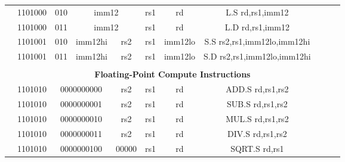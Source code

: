 \begin{table}[p]
\begin{small}
\begin{center}
\begin{tabular}{rcccccccccccl}
&
\multicolumn{1}{|c|}{1101000} &
\multicolumn{1}{c|}{010} &
\multicolumn{4}{c|}{imm12} &
\multicolumn{1}{c|}{rs1} &
\multicolumn{1}{c|}{rd} & L.S rd,rs1,imm12 \\
\cline{2-9}
  

&
\multicolumn{1}{|c|}{1101000} &
\multicolumn{1}{c|}{011} &
\multicolumn{4}{c|}{imm12} &
\multicolumn{1}{c|}{rs1} &
\multicolumn{1}{c|}{rd} & L.D rd,rs1,imm12 \\
\cline{2-9}
  

&
\multicolumn{1}{|c|}{1101001} &
\multicolumn{1}{c|}{010} &
\multicolumn{3}{c|}{imm12hi} &
\multicolumn{1}{c|}{rs2} &
\multicolumn{1}{c|}{rs1} &
\multicolumn{1}{c|}{imm12lo} & S.S rs2,rs1,imm12lo,imm12hi \\
\cline{2-9}
  

&
\multicolumn{1}{|c|}{1101001} &
\multicolumn{1}{c|}{011} &
\multicolumn{3}{c|}{imm12hi} &
\multicolumn{1}{c|}{rs2} &
\multicolumn{1}{c|}{rs1} &
\multicolumn{1}{c|}{imm12lo} & S.D rs2,rs1,imm12lo,imm12hi \\
\cline{2-9}
  

&
\multicolumn{11}{c}{} & \\
&
\multicolumn{11}{c}{\bf Floating-Point Compute Instructions} & \\
\cline{2-9}
  

&
\multicolumn{1}{|c|}{1101010} &
\multicolumn{4}{c|}{0000000000} &
\multicolumn{1}{c|}{rs2} &
\multicolumn{1}{c|}{rs1} &
\multicolumn{1}{c|}{rd} & ADD.S rd,rs1,rs2 \\
\cline{2-9}
  

&
\multicolumn{1}{|c|}{1101010} &
\multicolumn{4}{c|}{0000000001} &
\multicolumn{1}{c|}{rs2} &
\multicolumn{1}{c|}{rs1} &
\multicolumn{1}{c|}{rd} & SUB.S rd,rs1,rs2 \\
\cline{2-9}
  

&
\multicolumn{1}{|c|}{1101010} &
\multicolumn{4}{c|}{0000000010} &
\multicolumn{1}{c|}{rs2} &
\multicolumn{1}{c|}{rs1} &
\multicolumn{1}{c|}{rd} & MUL.S rd,rs1,rs2 \\
\cline{2-9}
  

&
\multicolumn{1}{|c|}{1101010} &
\multicolumn{4}{c|}{0000000011} &
\multicolumn{1}{c|}{rs2} &
\multicolumn{1}{c|}{rs1} &
\multicolumn{1}{c|}{rd} & DIV.S rd,rs1,rs2 \\
\cline{2-9}
  

&
\multicolumn{1}{|c|}{1101010} &
\multicolumn{4}{c|}{0000000100} &
\multicolumn{1}{c|}{00000} &
\multicolumn{1}{c|}{rs1} &
\multicolumn{1}{c|}{rd} & SQRT.S rd,rs1 \\
\cline{2-9}
  


\end{tabular}
\end{center}
\end{small}
\end{table}
